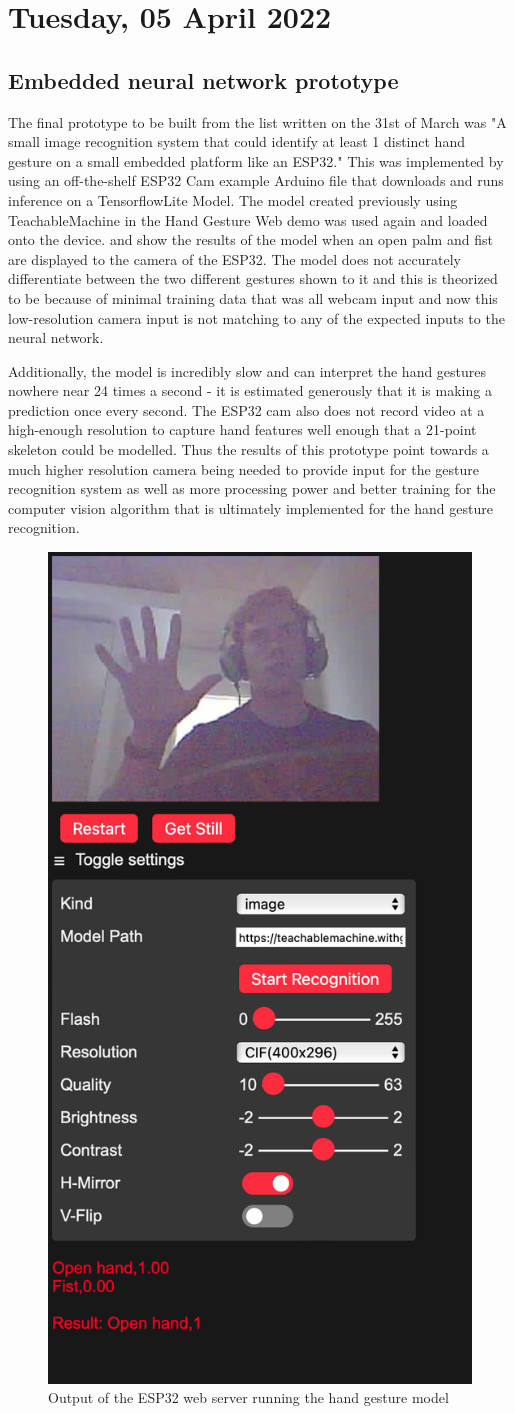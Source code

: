 \section[2022/04/05]{Tuesday, 05 April 2022}

\subsection{Embedded neural network prototype}

The final prototype to be built from the list written on the 31st of March was "A small image recognition system that could identify at least 1 distinct hand gesture on a small embedded platform like an ESP32." This was implemented by using an off-the-shelf ESP32 Cam example Arduino file that downloads and runs inference on a TensorflowLite Model. The model created previously using TeachableMachine in the Hand Gesture Web demo was used again and loaded onto the device.  and  show the results of the model when an open palm and fist are displayed to the camera of the ESP32. The model does not accurately differentiate between the two different gestures shown to it and this is theorized to be because of minimal training data that was all webcam input and now this low-resolution camera input is not matching to any of the expected inputs to the neural network. \newline

Additionally, the model is incredibly slow and can interpret the hand gestures nowhere near 24 times a second - it is estimated generously that it is making a prediction once every second. The ESP32 cam also does not record video at a high-enough resolution to capture hand features well enough that a 21-point skeleton could be modelled. Thus the results of this prototype point towards a much higher resolution camera being needed to provide input for the gesture recognition system as well as more processing power and better training for the computer vision algorithm that is ultimately implemented for the hand gesture recognition. \newline

\begin{figure}[h]
    \centering
    \includegraphics[width=0.3\linewidth]{figures/esp32_cam_open.png}
    \caption{Output of the ESP32 web server running the hand gesture model}
    \label{fig:esp32_cam1}
\end{figure}

